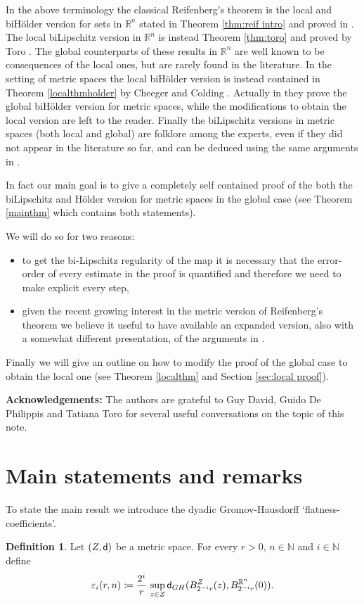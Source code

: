 \documentclass[11pt]{article}
\newcommand{\eps}{\varepsilon}
\newcommand{\rr}{\mathbb{R}}
\newcommand{\sfd}{{\sf d}}
\theoremstyle{plain}
\theoremstyle{definition}
\newtheorem{definition}[theorem]{Definition}
\numberwithin{equation}{section}
\begin{document}
In the above terminology the classical Reifenberg's theorem is the local and biH\"older version for sets in $\rr^n$ stated in Theorem \ref{thm:reif intro} and proved in \cite{r}. The local biLipschitz version in $\rr^n$ is instead Theorem \ref{thm:toro} and proved by Toro \cite{toro}. The global counterparts of these results in  $\rr^n$ are well known to be consequences of the local ones, but are  rarely found in the literature. 
In the setting of metric spaces the local biH\"older version  is instead contained in Theorem \ref{localthmholder} by Cheeger and Colding \cite{Cheegercolding}. Actually in \cite{Cheegercolding} they prove the global biH\"older version for metric spaces, while the modifications to obtain the local version are left to the reader. Finally the biLipschitz versions  in metric spaces (both local and global) are folklore among the experts, even if they did not appear in the literature so far, and can be deduced using the same arguments in \cite{Cheegercolding}.

In fact our main goal is to give a completely self contained proof of the both the biLipschitz and H\"older  version for metric spaces in the global case (see Theorem \ref{mainthm} which contains both statements). 

We will do so for two reasons:
\begin{itemize}
	\item to get the bi-Lipschitz regularity  of the map it is necessary that the error-order of every estimate in the proof is quantified and therefore we need to make explicit every step,
	\item given the recent growing interest in the metric version of Reifenberg's theorem  we believe it useful to have available an expanded version, also with a somewhat different presentation, of the arguments in \cite{Cheegercolding}.
\end{itemize}

Finally we will give an outline on how to modify the proof of the global case to obtain the local one (see Theorem \ref{localthm} and Section \ref{sec:local proof}). 


\medskip

\textbf{Acknowledgements: } 
The authors are grateful to Guy David, Guido De Philippis and Tatiana Toro for several useful conversations on the topic of this note.



\section{Main statements and remarks}\label{sec:bilipremark}
To state the main result we introduce the dyadic Gromov-Hausdorff `flatness-coefficients'.
\begin{definition}\label{ghjonest}
	Let $(Z,\sfd)$ be a metric space. For every $r>0$, $n \in \mathbb{N}$ and  $i\in \mathbb{N}$ define 
	\begin{equation}\label{ghjones}
		\eps_{i}(r,n)\coloneqq\frac{2^i}{r}\, \sup_{z \in Z} \sfd_{GH}(B^Z_{2^{-i}r}(z),B^{\rr^n}_{2^{-i}r}(0)).
	\end{equation}
\end{definition}
\end{document}
